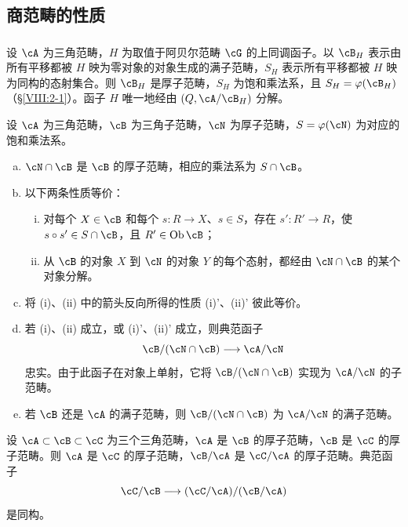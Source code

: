 \subsection{商范畴的性质}\label{VIII:2-4}
\subsubsection{}\label{VIII:2-4-1}
设 $\cA$ 为三角范畴，$H$ 为取值于阿贝尔范畴 $\cG$ 的上同调函子。以 $\cB_H$ 表示由所有平移都被 $H$ 映为零对象的对象生成的满子范畴，$S_H$ 表示所有平移都被 $H$ 映为同构的态射集合。则 $\cB_H$ 是厚子范畴，$S_H$ 为饱和乘法系，且 $S_H=\varphi(\cB_H)$（\S\ref{VIII:2-1}）。函子 $H$ 唯一地经由 $(Q,\cA/\cB_H)$ 分解。
\begin{theorem}\label{VIII:2-4-2}
设 $\cA$ 为三角范畴，$\cB$ 为三角子范畴，$\cN$ 为厚子范畴，$S=\varphi(\cN)$ 为对应的饱和乘法系。
\begin{enumerate}[(a)]
\item $\cN\cap\cB$ 是 $\cB$ 的厚子范畴，相应的乘法系为 $S\cap\cB$。
\item 以下两条性质等价：
\begin{enumerate}[(i)]
\item 对每个 $X\in\cB$ 和每个 $s:R\to X$、$s\in S$，存在 $s':R'\to R$，使 $s\circ s'\in S\cap\cB$，且 $R'\in\operatorname{Ob}\cB$；
\item 从 $\cB$ 的对象 $X$ 到 $\cN$ 的对象 $Y$ 的每个态射，都经由 $\cN\cap\cB$ 的某个对象分解。
\end{enumerate}
\item 将 (i)、(ii) 中的箭头反向所得的性质 (i)'、(ii)' 彼此等价。
\item 若 (i)、(ii) 成立，或 (i)'、(ii)' 成立，则典范函子
\[\cB/(\cN\cap\cB)\longrightarrow\cA/\cN\]
忠实。由于此函子在对象上单射，它将 $\cB/(\cN\cap\cB)$ 实现为 $\cA/\cN$ 的子范畴。
\item 若 $\cB$ 还是 $\cA$ 的满子范畴，则 $\cB/(\cN\cap\cB)$ 为 $\cA/\cN$ 的满子范畴。
\end{enumerate}
\end{theorem}
\begin{corollary}\label{VIII:2-4-3}
设 $\cA\subset\cB\subset\cC$ 为三个三角范畴，$\cA$ 是 $\cB$ 的厚子范畴，$\cB$ 是 $\cC$ 的厚子范畴。则 $\cA$ 是 $\cC$ 的厚子范畴，$\cB/\cA$ 是 $\cC/\cA$ 的厚子范畴。典范函子
\[\cC/\cB\longrightarrow(\cC/\cA)/(\cB/\cA)\]
是同构。
\end{corollary}
